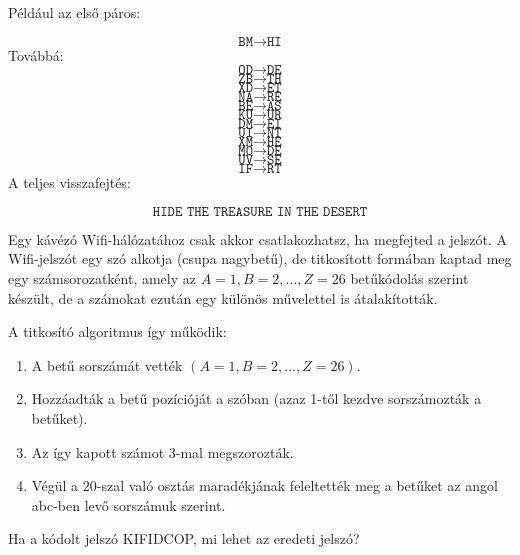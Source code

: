 \begin{solution}
Például az első páros:

\[
\texttt{BM}\rightarrow\texttt{HI}
\]
Továbbá: 
\[
\texttt{OD}\rightarrow\texttt{DE}
\]
\[
\texttt{ZB}\rightarrow\texttt{TH}
\]
\[
\texttt{XD}\rightarrow\texttt{ET}
\]
\[
\texttt{NA}\rightarrow\texttt{RE}
\]
\[
\texttt{BE}\rightarrow\texttt{AS}
\]
\[
\texttt{KU}\rightarrow\texttt{UR}
\]
\[
\texttt{DM}\rightarrow\texttt{EI}
\]
\[
\texttt{UI}\rightarrow\texttt{NT}
\]
\[
\texttt{XM}\rightarrow\texttt{HE}
\]
\[
\texttt{MO}\rightarrow\texttt{DE}
\]
\[
\texttt{UV}\rightarrow\texttt{SE}
\]
\[
\texttt{IF}\rightarrow\texttt{RT}
\]
A teljes visszafejtés:

\[
\texttt{HIDE\ THE\ TREASURE\ IN\ THE\ DESERT}
\]
\end{solution}
\begin{extraproblem}
Egy kávézó Wifi-hálózatához csak akkor csatlakozhatsz, ha megfejted
a jelszót. A Wifi-jelszót egy szó alkotja (csupa nagybetű), de titkosított
formában kaptad meg egy számsorozatként, amely az $A=1,B=2,...,Z=26$
betűkódolás szerint készült, de a számokat ezután egy különös művelettel
is átalakították.

A titkosító algoritmus így működik: 
\begin{enumerate}
\item A betű sorszámát vették $(A=1,B=2,...,Z=26)$. 
\item Hozzáadták a betű pozícióját a szóban (azaz 1-től kezdve sorszámozták
a betűket). 
\item Az így kapott számot $3$-mal megszorozták. 
\item Végül a $20$-szal való osztás maradékjának feleltették meg a betűket
az angol abc-ben levő sorszámuk szerint. 
\end{enumerate}
Ha a kódolt jelszó KIFIDCOP, mi lehet az eredeti jelszó? 
\end{extraproblem}

